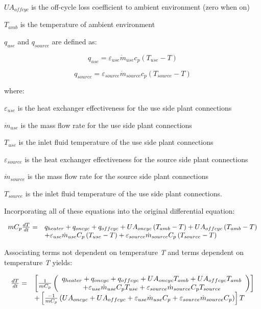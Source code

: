 \(UA_{offcyc}\) is the off-cycle loss coefficient to ambient environment (zero when on)

\(T_{amb}\) is the temperature of ambient environment

\(q_{use}\) and \(q_{source}\) are defined as:

\begin{equation}
{q_{use}} = {\varepsilon_{use}}{\dot m_{use}}{c_p}\left( {{T_{use}} - T} \right)
\end{equation}

\begin{equation}
{q_{source}} = {\varepsilon_{source}}{\dot m_{source}}{c_p}\left( {{T_{source}} - T} \right)
\end{equation}

where:

\({\varepsilon_{use}}\) is the heat exchanger effectiveness for the use side plant connections

\({\dot m_{use}}\) is the mass flow rate for the use side plant connections

\(T_{use}\) is the inlet fluid temperature of the use side plant connections

\({\varepsilon_{source}}\) is the heat exchanger effectiveness for the source side plant connections

\({\dot m_{source}}\) is the mass flow rate for the source side plant connections

\(T_{source}\) is the inlet fluid temperature of the use side plant connections.

Incorporating all of these equations into the original differential equation:

\begin{equation}
  \begin{array}{rl}
    mC_p\frac{dT}{dt} =& q_{heater} + q_{oncyc} + q_{offcyc} + UA_{oncyc} \left(T_{amb} - T\right) + UA_{offcyc} \left(T_{amb} - T\right) \\ 
                      &+ \varepsilon_{use}\dot{m}_{use}C_p \left(T_{use} - T\right) + \varepsilon_{source}\dot{m}_{source}C_p \left(T_{source} - T\right)
  \end{array}
\end{equation}

Associating terms not dependent on temperature \emph{T} and terms dependent on temperature \emph{T} yields:

\begin{equation}
  \begin{array}{rl}
    \frac{dT}{dt} =& \left[\frac{1}{mC_p}\left(\begin{array}{c}
                                             q_{heater}+q_{oncyc}+q_{offcyc}+UA_{oncyc}T_{amb}+UA_{offcyc}T_{amb} \\
                                             + \varepsilon_{use}\dot{m}_{use}C_pT_{use} + \varepsilon_{source}\dot{m}_{source}C_pT_{source}
                                           \end{array}\right)\right] \\
                  &+ \left[\frac{-1}{mC_p}\left(UA_{oncyc} + UA_{offcyc}+\varepsilon_{use}\dot{m}_{use}C_p+\varepsilon_{source}\dot{m}_{source}C_p\right)\right]T
  \end{array}
\end{equation}

